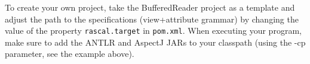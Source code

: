 \documentclass{article}
\begin{document}
To create your own project, take the BufferedReader project as a template and adjust the path to the specifications (view+attribute grammar) by changing the value of the property \lstinline+rascal.target+ in \lstinline+pom.xml+.  When executing your program, make sure to add the ANTLR and AspectJ JARs to your classpath (using the -cp parameter, see the example above).

%
%
%
%
%
\end{document}
